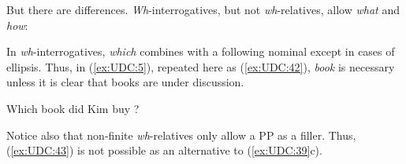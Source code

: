 \documentclass[output=paper
                ,modfonts
                ,nonflat
	        ,collection
	        ,collectionchapter
	        ,collectiontoclongg
 	        ,biblatex
                ,babelshorthands
                ,newtxmath
                ,draftmode
                ,colorlinks, citecolor=brown
]{./langsci/langscibook}
\begin{document}
{\begin{exe} \ex \begin{xlist} \label{ex:UDC:38}

\end{xlist}
\end{exe}

\begin{exe} \ex \begin{xlist} \label{ex:UDC:39}

\end{xlist}
\end{exe}

\noindent
But there are differences. \emph{Wh}-interrogatives, but not
\emph{wh}-relatives, allow \emph{what} and \emph{how}:

\begin{exe} \ex \begin{xlist} \label{ex:UDC:40}

\end{xlist}
\end{exe}\noindent

\begin{exe} \ex \begin{xlist} \label{ex:UDC:41}

\end{xlist}
\end{exe}

\noindent
In \emph{wh}-interrogatives, \emph{which} combines with a following
nominal except in cases of ellipsis. Thus, in (\ref{ex:UDC:5}), repeated here as (\ref{ex:UDC:42}), \emph{book} is
necessary unless it is clear that books are under discussion.

\begin{exe}
\ex \label{ex:UDC:42}
 Which book did Kim buy \trace{}?
\end{exe}\noindent
Notice also that non-finite \emph{wh}-relatives only allow a PP as a
filler. Thus, (\ref{ex:UDC:43}) is not possible as an alternative to (\ref{ex:UDC:39}c).

\begin{exe}
     \label{ex:UDC:43}
\end{exe}

}
\end{document}
